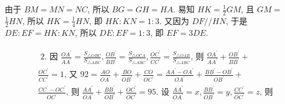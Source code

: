 \documentclass[10pt]{article}
\begin{document}
由于 $B M=M N=N C$, 所以 $B G=G H=H A$. 易知 $H K=\frac{1}{2} G M$, 且 $G M=$ $\frac{1}{2} H N$, 所以 $H K=\frac{1}{4} H N$, 即 $H K: K N=1: 3$. 又因为 $D F / / H N$, 于是 $D E: E F=H K: K N$, 所以 $D E: E F=1: 3$, 即 $E F=3 D E$.

\begin{align*}
\begin{aligned}
& \text { 2. 因 } \frac{O A^{\prime}}{A A^{\prime}}=\frac{S_{\triangle O B C}}{S_{\triangle A B C}}, \frac{O B^{\prime}}{B B^{\prime}}=\frac{S_{\triangle O C A}}{S_{\triangle A B C}}, \frac{O C^{\prime}}{C C^{\prime}}=\frac{S_{\triangle O A B}}{S_{\triangle A B C}} \text {, 则 } \frac{O A^{\prime}}{A A^{\prime}}+\frac{O B^{\prime}}{B B^{\prime}}+ \\
& \frac{O C^{\prime}}{C C^{\prime}}=1 \text {, 又 } 92=\frac{A O}{O A^{\prime}}+\frac{B O}{O B^{\prime}}+\frac{C O}{O C^{\prime}}=\frac{A A^{\prime}-O A^{\prime}}{O A^{\prime}}+\frac{B B^{\prime}-O B^{\prime}}{O B^{\prime}}+ \\
& \frac{C C^{\prime}-O C^{\prime}}{O C^{\prime}} \text {, 则 } \frac{A A^{\prime}}{O A^{\prime}}+\frac{B B^{\prime}}{O B^{\prime}}+\frac{O C^{\prime}}{O C^{\prime}}=95 \text {. 设 } \frac{A A^{\prime}}{O A^{\prime}}=x, \frac{B B^{\prime}}{O B^{\prime}}=y, \frac{C C^{\prime}}{O C^{\prime}}=z \text {, 则 }
\end{aligned}
\end{align*}
\end{document}
